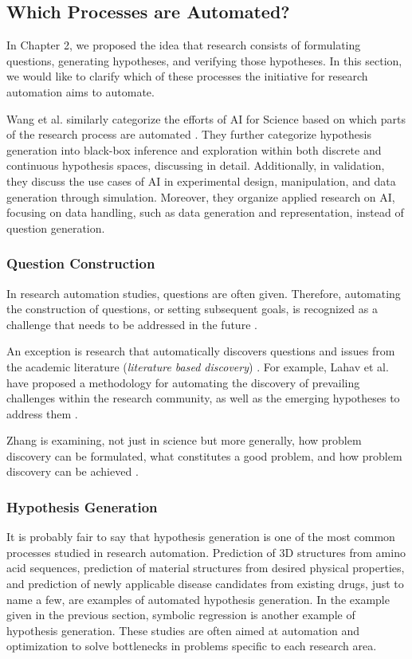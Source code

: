 \subsection{Which Processes are Automated?}
In Chapter 2, we proposed the idea that research consists of formulating questions, generating hypotheses, and verifying those hypotheses. In this section, we would like to clarify which of these processes the initiative for research automation aims to automate. 

Wang et al. similarly categorize the efforts of AI for Science based on which parts of the research process are automated \cite{wang2023scientific}. They further categorize hypothesis generation into black-box inference and exploration within both discrete and continuous hypothesis spaces, discussing in detail. Additionally, in validation, they discuss the use cases of AI in experimental design, manipulation, and data generation through simulation. Moreover, they organize applied research on AI, focusing on data handling, such as data generation and representation, instead of question generation.

\subsubsection{Question Construction}

In research automation studies, questions are often given. Therefore, automating the construction of questions, or setting subsequent goals, is recognized as a challenge that needs to be addressed in the future \cite{coley2020autonomousII,zenil2023,kitano2021nobel}. 

An exception is research that automatically discovers questions and issues from the academic literature (\textit{literature based discovery}) \cite{lahav2022search,wang2023learning}. For example, Lahav et al. have proposed a methodology for automating the discovery of prevailing challenges within the research community, as well as the emerging hypotheses to address them \cite{lahav2022search}.

Zhang is examining, not just in science but more generally, how problem discovery can be formulated, what constitutes a good problem, and how problem discovery can be achieved \cite{zhang2021problem}. %

\subsubsection{Hypothesis Generation}
It is probably fair to say that hypothesis generation is one of the most common processes studied in research automation. Prediction of 3D structures from amino acid sequences, prediction of material structures from desired physical properties, and prediction of newly applicable disease candidates from existing drugs, just to name a few, are examples of automated hypothesis generation. In the example given in the previous section, symbolic regression is another example of hypothesis generation. These studies are often aimed at automation and optimization to solve bottlenecks in problems specific to each research area.

